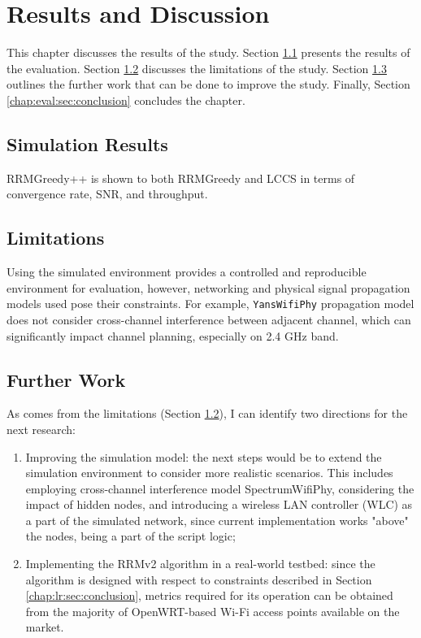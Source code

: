 \chapter{Results and Discussion}
\label{chap:eval}

This chapter discusses the results of the study.
Section \ref{chap:eval:sec:results} presents the results of the evaluation. Section \ref{chap:eval:sec:limitations} discusses the limitations of the study. Section \ref{chap:eval:sec:further_work} outlines the further work that can be done to improve the study. Finally, Section \ref{chap:eval:sec:conclusion} concludes the chapter.

\section{Simulation Results}
\label{chap:eval:sec:results}
RRMGreedy++ is shown to both RRMGreedy and LCCS in terms of convergence rate, SNR, and throughput.

\section{Limitations}
\label{chap:eval:sec:limitations}

Using the simulated environment provides a controlled and reproducible environment for evaluation, however, networking and physical signal propagation models used pose their constraints. For example, \texttt{YansWifiPhy} propagation model does not consider cross-channel interference between adjacent channel, which can significantly impact channel planning, especially on 2.4 GHz band.

\section{Further Work}
\label{chap:eval:sec:further_work}
As comes from the limitations (Section \ref{chap:eval:sec:limitations}), I can identify two directions for the next research:
\begin{enumerate}
    \item Improving the simulation model: the next steps would be to extend the simulation environment to consider more realistic scenarios. This includes employing cross-channel interference model SpectrumWifiPhy, considering the impact of hidden nodes, and introducing a wireless LAN controller (WLC) as a part of the simulated network, since current implementation works "above" the nodes, being a part of the script logic;
    \item Implementing the RRMv2 algorithm in a real-world testbed: since the algorithm is designed with respect to constraints described in Section \ref{chap:lr:sec:conclusion}, metrics required for its operation can be obtained from the majority of OpenWRT-based Wi-Fi access points available on the market.
\end{enumerate}


